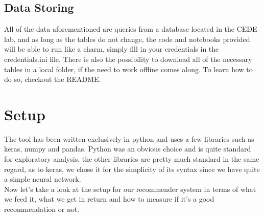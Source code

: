 \documentclass{article}
\begin{document}
\begin{flushleft}
\end{flushleft}

    \newpage
    \subsection{Data Storing}
        All of the data aforementioned are queries from a database located in the CEDE\cite{cede} lab, and as long as the tables do not change, the code and notebooks provided will be able to run like a charm, simply fill in your credentials in the credentials.ini file. There is also the possibility to download all of the necessary tables in a local folder, if the need to work offline comes along. To learn how to do so, checkout the README.

\section{Setup}
    The tool has been written exclusively in python and uses a few libraries such as keras\cite{keras}, numpy and pandas. Python was an obvious choice and is quite standard for exploratory analysis, the other libraries are pretty much standard in the same regard, as to keras\cite{keras}, we chose it for the simplicity of its syntax since we have quite a simple neural network.
    \\Now let's take a look at the setup for our recommender system in terms of what we feed it, what we get in return and how to measure if it's a good recommendation or not.
\end{document}

